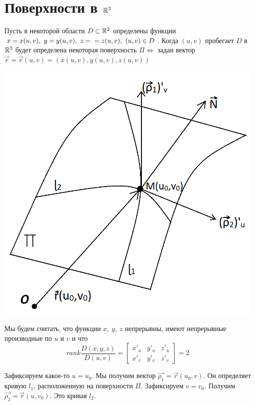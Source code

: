 \documentclass[../../main.tex]{subfiles}
\begin{document}
\section{Поверхности в $\mathbb{R}^3$}

Пусть в некоторой области $D \subset \mathbb{R}^2$ определены функции 
$x = x(u,v),\ y =y(u,v),\ z = \\ = z(u,v),\ (u,v) \in D$. 
Когда $(u,v)$ пробегает $D$ в $\mathbb{R}^3$ 
будет определена некоторая поверхность $\Pi 
\iff$ задан вектор $\vec{r} = \vec{r}(u,v) = (x(u,v), y(u,v), z(u,v))$

\begin{center}
\includegraphics[scale = 0.5]{lec21_4.png}
\end{center}

Мы будем считать, что функции $x,\ y,\ z$ непрерывны, 
имеют непрерывные производные по $u$ и $v$ и что
\begin{equation}
\label{lec_21, num_2}
rank \dfrac{D(x,y,z)}{D(u,v)} = 
\begin{bmatrix}
x'_u & y'_u & z'_u \\
x'_v & y'_v & z'_v
\end{bmatrix} = 2
\end{equation}

Зафиксируем какое-то $u=u_0$. Мы получим вектор
$\vec{\rho_1} = \vec{r}(u_0,v)$. 
Он определяет кривую $l_1$, расположенную на поверхности $\Pi$.
Зафиксируем $v = v_0$. Получим $\vec{\rho_2} = \vec{r}(u,v_0)$. 
Это кривая $l_2$.
\end{document}
